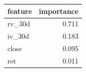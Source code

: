 \begin{tabular}{lr}
\toprule
feature & importance \\
\midrule
rv_30d & 0.711 \\
iv_30d & 0.183 \\
close & 0.095 \\
ret & 0.011 \\
\bottomrule
\end{tabular}
